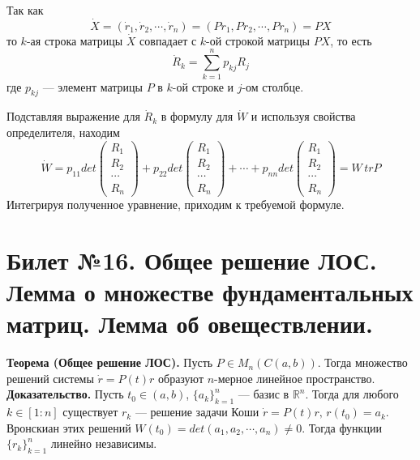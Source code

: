 \documentclass{article}
\begin{document}
Так как
\begin{equation*}
    \dot{X} = (\dot{r}_1, \dot{r}_2, \cdots, \dot{r}_n) = (Pr_1, Pr_2, \cdots, Pr_n) = PX
\end{equation*}
то $k$-ая строка матрицы $\dot{X}$ совпадает с $k$-ой строкой матрицы $PX$, то есть
\begin{equation*}
    \dot{R}_k = \sum_{k=1}^n p_{kj}R_j
\end{equation*}
где $p_{kj}$ --- элемент матрицы $P$ в $k$-ой строке и $j$-ом столбце.

Подставляя выражение для $\dot{R}_k$ в формулу для $\dot{W}$ и используя свойства определителя, находим
\begin{equation*}
    \dot{W} = p_{11}det\begin{pmatrix}
    R_1\\
    R_2\\
    \cdots\\
    R_n
    \end{pmatrix} + p_{22}det\begin{pmatrix}
    R_1\\
    R_2\\
    \cdots\\
    R_n
    \end{pmatrix} + \cdots + p_{nn}det\begin{pmatrix}
    R_1\\
    R_2\\
    \cdots\\
    R_n
    \end{pmatrix} = W\,trP
\end{equation*}
Интегрируя полученное уравнение, приходим к требуемой формуле.

\section{Билет №16. Общее решение ЛОС. Лемма о множестве фундаментальных матриц. Лемма об овеществлении.}
\textbf{Теорема (Общее решение ЛОС).} Пусть $P \in M_n(C(a,b))$. Тогда множество решений системы $\dot{r} = P(t)r$ образуют $n$-мерное линейное пространство.\\

\noindent \textbf{Доказательство.} Пусть $t_0 \in (a,b)$, $\{a_k\}_{k=1}^n$ --- базис в $\mathbb{R}^n$. Тогда для любого $k \in [1 : n]$ существует $r_k$ --- решение задачи Коши $\dot{r} = P(t)r,\, r(t_0) = a_k$. Вронскиан этих решений $W(t_0) = det(a_1, a_2, \cdots, a_n) \neq 0$. Тогда функции $\{r_k\}_{k=1}^n$ линейно независимы.
\end{document}
